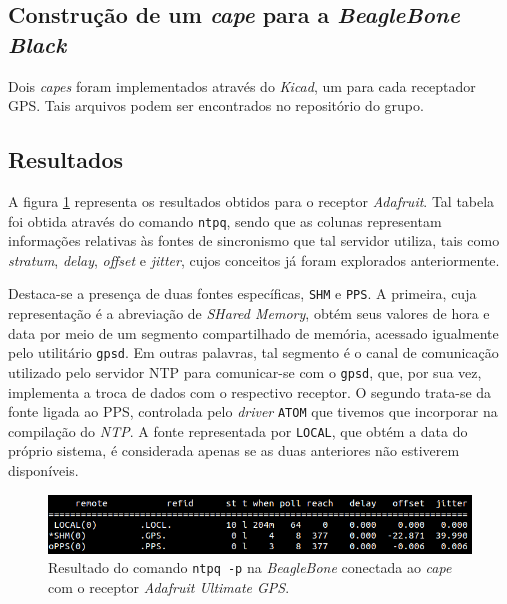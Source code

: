 \FloatBarrier
 
\subsection{Construção de um \textit{cape} para a \textit{BeagleBone Black}}

Dois \textit{capes} foram implementados através do \textit{Kicad}, um para cada
receptador GPS. Tais arquivos podem ser encontrados no repositório do grupo.


\subsection{Resultados}

A figura \ref{img:adafruit} representa os resultados obtidos para o receptor
\textit{Adafruit}. Tal tabela foi obtida através do comando \texttt{ntpq}, sendo
que as colunas representam informações relativas às fontes de sincronismo que
tal servidor utiliza, tais como \textit{stratum}, \textit{delay},
\textit{offset} e \textit{jitter}, cujos conceitos já foram explorados
anteriormente.

\vspace{12pt}

Destaca-se a presença de duas fontes específicas, \texttt{SHM} e \texttt{PPS}.
A primeira, cuja representação é a abreviação de \textit{SHared Memory}, obtém
seus valores de hora e data por meio de um segmento compartilhado de memória,
acessado igualmente pelo utilitário \texttt{gpsd}. Em outras palavras, tal
segmento é o canal de comunicação utilizado pelo servidor NTP para comunicar-se
com o \texttt{gpsd}, que, por sua vez, implementa a troca de dados com o
respectivo receptor. O segundo trata-se da fonte ligada ao PPS, controlada pelo
\textit{driver} \texttt{ATOM} que tivemos que incorporar na compilação do
\textit{NTP}. A fonte representada por \texttt{LOCAL}, que obtém a data do
próprio sistema, é considerada apenas se as duas anteriores não estiverem
disponíveis.

\FloatBarrier

\begin{figure}[h]
    
    \centering
    \includegraphics[scale=0.6]{image/adafruit_GPS}
    \caption {\centering Resultado do comando \texttt{ntpq -p} na
    \textit{BeagleBone} conectada ao \textit{cape} com o receptor \textit{Adafruit Ultimate GPS}.}
    \label{img:adafruit} 
\end{figure} 

